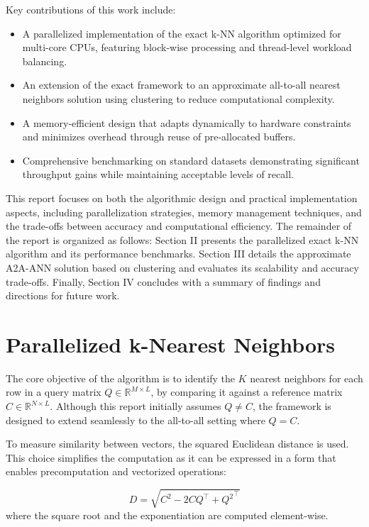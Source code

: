 \documentclass[conference]{IEEEtran}
\begin{document}
Key contributions of this work include:
\begin{itemize}
    \item A parallelized implementation of the exact k-NN algorithm optimized for multi-core CPUs, 
    featuring block-wise processing and thread-level workload balancing.
    \item An extension of the exact framework to an approximate all-to-all nearest neighbors solution 
    using clustering to reduce computational complexity.
    \item A memory-efficient design that adapts dynamically to hardware constraints and minimizes overhead 
    through reuse of pre-allocated buffers.
    \item Comprehensive benchmarking on standard datasets demonstrating significant throughput gains while 
    maintaining acceptable levels of recall.
\end{itemize}

This report focuses on both the algorithmic design and practical implementation aspects, including 
parallelization strategies, memory management techniques, and the trade-offs between accuracy and 
computational efficiency. The remainder of the report is organized as follows: Section II presents 
the parallelized exact k-NN algorithm and its performance benchmarks. Section III details the approximate 
A2A-ANN solution based on clustering and evaluates its scalability and accuracy trade-offs. Finally, 
Section IV concludes with a summary of findings and directions for future work.


\section{Parallelized k-Nearest Neighbors}

The core objective of the algorithm is to identify the $K$ nearest neighbors for each row in a query 
matrix $Q \in \mathbb{R}^{M \times L}$, by comparing it against a reference matrix $C \in \mathbb{R}^{N \times L}$.
Although this report initially assumes $Q \neq C$, the framework is designed to extend seamlessly to the all-to-all
setting where $Q = C$.

To measure similarity between vectors, the squared Euclidean distance is used. This choice simplifies the 
computation as it can be expressed in a form that enables precomputation and vectorized operations:

\[
D = \sqrt{C^2 - 2CQ^\top + {Q^2}^{\top}}
\]
where the square root and the exponentiation are computed element-wise.
\end{document}
